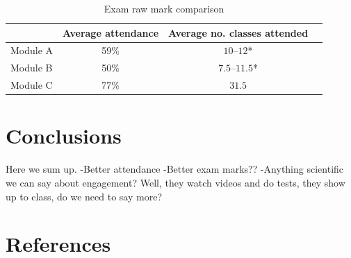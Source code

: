 \documentclass{amsart}
\begin{document}
\begin{table}[htb]
\begin{tabular}{lccc}
& Average attendance & Average no. classes attended\\\hline
Module A & 59\% & $10$--$12$*\\
Module B & 50\% & $7.5$--$11.5$*\\
Module C & 77\% & $31.5$
\end{tabular}
\caption{Exam raw mark comparison}
\end{table}



\section{Conclusions}
Here we sum up.
-Better attendance
-Better exam marks??
-Anything scientific we can say about engagement? Well, they watch videos and do tests, they show up to class, do we need to say more?

\section{References}
\end{document}
